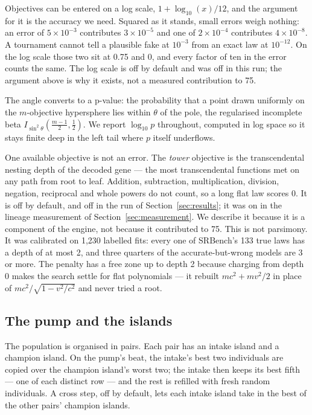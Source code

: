 \documentclass[11pt,a4paper]{article}
\begin{document}
Objectives can be entered on a log scale, $1 + \log_{10}(x)/12$, and the argument
for it is the accuracy we need. Squared as it stands, small errors weigh nothing: an
error of $5\times10^{-3}$ contributes $3\times10^{-5}$ and one of
$2\times10^{-4}$ contributes $4\times10^{-8}$. A tournament cannot tell a
plausible fake at $10^{-3}$ from an exact law at $10^{-12}$. On the log scale
those two sit at 0.75 and 0, and every factor of ten in the error counts the
same. The log scale is off by default and was off in this run; the argument
above is why it exists, not a measured contribution to 75.

The angle converts to a p-value: the probability that a point drawn uniformly on
the $m$-objective hypersphere lies within $\theta$ of the pole, the regularised
incomplete beta $I_{\sin^2\theta}\!\left(\frac{m-1}{2}, \frac12\right)$. We
report $\log_{10} p$ throughout, computed in log space so it stays finite deep
in the left tail where $p$ itself underflows.

One available objective is not an error. The \emph{tower} objective is the
transcendental
nesting depth of the decoded gene --- the most transcendental functions met on
any path from root to leaf. Addition, subtraction, multiplication, division,
negation, reciprocal and whole powers do not count, so a long flat law scores 0.
It is off by default, and off in the run of Section~\ref{sec:results}; it was on
in the lineage measurement of Section~\ref{sec:measurement}. We describe it
because it is a component of the engine, not because it contributed to 75.
This is not parsimony. It was calibrated on 1{,}230 labelled fits: every one of
SRBench's 133 true laws has a depth of at most 2, and three quarters of the
accurate-but-wrong models are 3 or more. The penalty has a free zone up to depth
2 because charging from depth 0 makes the search settle for flat polynomials ---
it rebuilt $mc^2 + mv^2/2$ in place of $mc^2/\sqrt{1 - v^2/c^2}$ and never tried
a root.

\subsection{The pump and the islands}

The population is organised in pairs. Each pair has an intake island and a
champion island. On the pump's beat, the intake's best two individuals are copied
over the champion island's worst two; the intake then keeps its best fifth ---
one of each distinct row --- and the rest is refilled with fresh random
individuals. A cross step, off by default, lets each intake island take in the
best of the other pairs' champion islands.
\end{document}
